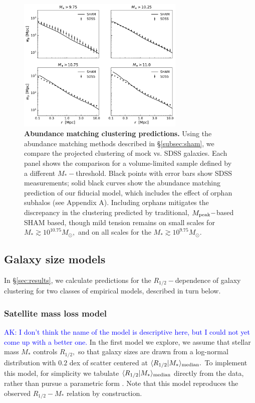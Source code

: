 \documentclass[usenatbib,usegraphicx,letterpaper]{mn2e}
\newcommand{\rhalf}{R_{1/2}}
\newcommand{\mstar}{M_{\ast}}
\newcommand{\mpeak}{M_{\rm peak}}
\newcommand{\median}[2]{\langle{#1}\vert{#2}\rangle_{\rm median}}
\newcommand{\msun}{M_\odot}
\begin{document}
\begin{figure}
\centering
\includegraphics[width=8cm]{FIGS/baseline_sham.pdf}
\caption{
{\bf Abundance matching clustering predictions.}
Using the abundance matching methods described in \S\ref{subsec:sham}, we compare the projected clustering of mock vs. SDSS galaxies. Each panel shows the comparison for a volume-limited sample defined by a different $\mstar-$threshold. Black points with error bars show SDSS measurements; solid black curves show the abundance matching prediction of our fiducial model, which includes the effect of orphan subhalos (see Appendix A). Including orphans mitigates the discrepancy in the clustering predicted by traditional, $\mpeak-$based SHAM based, though mild tension remains on small scales for $\mstar\gtrsim10^{10.75}\msun,$ and on all scales for the $\mstar\gtrsim10^{9.75}\msun.$
}
\label{fig:baseline_sham_clustering}
\end{figure}

\subsection{Galaxy size models}
\label{subsec:model}

In \S\ref{sec:results}, we calculate predictions for the $\rhalf-$dependence of galaxy clustering for two classes of empirical models, described in turn below.

\subsubsection{Satellite mass loss model}
\label{subsubsec:strippingmodel}

\textcolor{blue}{AK: I don't think the name of the model is descriptive here, but I could not yet come up with a better one.}
In the first model we explore, we assume that stellar mass $\mstar$ controls $\rhalf,$ so that galaxy sizes are drawn from a log-normal distribution with $0.2$ dex of scatter centered at $\median{\rhalf}{\mstar}.$ To implement this model, for simplicity we tabulate $\median{\rhalf}{\mstar}$ directly from the data, rather than pursue a parametric form \citep[see, e.g.,][]{zhang_yang17}. Note that this model reproduces the observed $\rhalf-\mstar$ relation by construction. 
\end{document}
